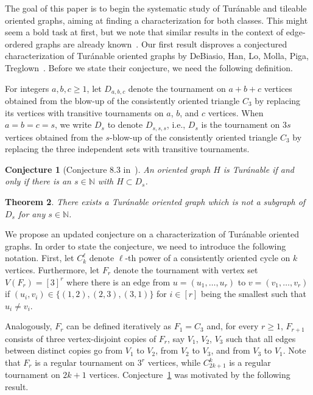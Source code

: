 \documentclass[11pt]{amsart}
\newtheorem{theorem}{Theorem}[section]
\newtheorem{conjecture}[theorem]{Conjecture}
\def\N{\mathbb{N}}
\begin{document}
The goal of this paper is to begin the systematic study of Tur\'anable and tileable oriented graphs, aiming at finding a characterization for both classes. This might seem a bold task at first, but we note that similar results in the context of edge-ordered graphs are already known~\cite{APTX, GMNPTV}. Our first result disproves a conjectured characterization of Tur\'anable oriented graphs by DeBiasio, Han, Lo, Molla, Piga, Treglown~\cite{DHLMPT}. Before we state their conjecture, we need the following definition.

For integers $a, b, c \ge 1$, let $D_{a,b,c}$ denote the tournament on $a+b+c$ vertices obtained from the blow-up of the consistently oriented triangle $C_3$ by replacing its vertices with transitive tournaments on $a$, $b$, and $c$ vertices.
When $a=b=c=s$, we write $D_s$ to denote $D_{s,s,s}$, i.e., $D_s$ is the tournament on $3s$ vertices obtained from the $s$-blow-up of the consistently oriented triangle $C_3$ by replacing the three independent sets with transitive tournaments.

\begin{conjecture}[Conjecture 8.3 in~\cite{DHLMPT}] \label{old_conj}
    An oriented graph $H$ is Tur\'anable if and only if there is an $s \in \N$ with $H \subset D_s$.
\end{conjecture}

\begin{theorem} \label{thm:conj_is_false}
    There exists a Tur\'anable oriented graph which is not a subgraph of $D_s$ for any $s \in \N$. 
\end{theorem}

We propose an updated conjecture on a characterization of Tur\'anable oriented graphs. In order to state the conjecture, we need to introduce the following notation. 
First, let $C_{k}^{\ell}$ denote $\ell$-th power of a consistently oriented cycle on $k$ vertices.
Furthermore, let $F_r$ denote the tournament with vertex set $V(F_r) = [3]^r$ where there is an edge from $u=(u_1,\dots, u_r)$ to $v = (v_1, \dots, v_r)$ if $(u_i,v_i) \in \{(1,2),(2,3),(3,1)\}$ for $i \in [r]$ being the smallest such that $u_i \neq v_i$. 

Analogously, $F_r$ can be defined iteratively as $F_1 = C_3$ and, for every $r\ge 1$, $F_{r+1}$ consists of three vertex-disjoint copies of $F_r$, say $V_1$, $V_2$, $V_3$ such that all edges between distinct copies go from $V_1$ to $V_2$, from $V_2$ to $V_3$, and from $V_3$ to $V_1$.
Note that $F_r$ is a regular tournament on $3^r$ vertices, while $C_{2k+1}^k$ is a regular tournament on $2k+1$ vertices. Conjecture~\ref{old_conj} was motivated by the following result.
\end{document}
